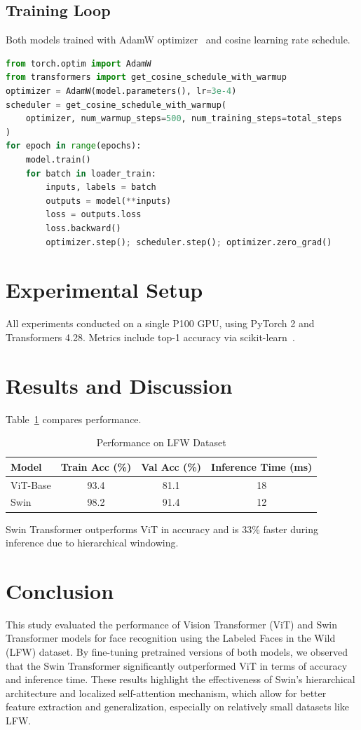 \documentclass[twocolumn]{IEEEtran}
\begin{document}
\subsection{Training Loop}
\setlength{\parindent}{4em}
Both models trained with AdamW optimizer~\cite{loshchilov2019decoupled} and cosine learning rate schedule.
\begin{lstlisting}[language=Python, caption=Training Loop Snippet]
from torch.optim import AdamW
from transformers import get_cosine_schedule_with_warmup
optimizer = AdamW(model.parameters(), lr=3e-4)
scheduler = get_cosine_schedule_with_warmup(
    optimizer, num_warmup_steps=500, num_training_steps=total_steps
)
for epoch in range(epochs):
    model.train()
    for batch in loader_train:
        inputs, labels = batch
        outputs = model(**inputs)
        loss = outputs.loss
        loss.backward()
        optimizer.step(); scheduler.step(); optimizer.zero_grad()
\end{lstlisting}

\section{Experimental Setup}
All experiments conducted on a single P100 GPU, using PyTorch 2 and Transformers 4.28. Metrics include top-1 accuracy via scikit-learn~\cite{pedregosa2011scikit}.

\section{Results and Discussion}
\setlength{\parindent}{0pt}
Table~\ref{tab:results} compares performance.
\begin{table}[H]
\centering
\caption{Performance on LFW Dataset}
\label{tab:results}
\begin{tabular}{lccc}
\hline
Model        & Train Acc (\%) & Val Acc (\%) & Inference Time (ms) \\
\hline
ViT-Base     & 93.4           & 81.1         & 18                  \\
Swin         & 98.2           & 91.4         & 12                  \\
\hline
\end{tabular}
\end{table}
Swin Transformer outperforms ViT in accuracy and is 33\% faster during inference due to hierarchical windowing.

\section{Conclusion}
\setlength{\parindent}{4em}
This study evaluated the performance of Vision Transformer (ViT) and Swin Transformer models for face recognition using the Labeled Faces in the Wild (LFW) dataset. By fine-tuning pretrained versions of both models, we observed that the Swin Transformer significantly outperformed ViT in terms of accuracy and inference time. These results highlight the effectiveness of Swin’s hierarchical architecture and localized self-attention mechanism, which allow for better feature extraction and generalization, especially on relatively small datasets like LFW.
\end{document}
